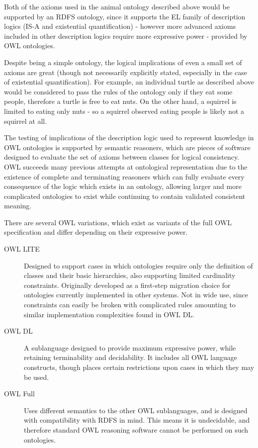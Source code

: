 \documentclass{article}
\begin{document}
Both of the axioms used in the animal ontology described above would be
supported by an RDFS ontology, since it supports the EL family of description
logics (IS-A and existential quantification) - however more advanced axioms
included in other description logics require more expressive power - provided by
OWL ontologies.

Despite being a simple ontology, the logical implications of even a small set of
axioms are great (though not necessarily explicitly stated, especially in the
case of existential quantification). For example, an individual turtle as described 
above would be considered to pass the rules of the ontology only if they eat some 
people, therefore a turtle is free to eat nuts. On the other hand, a squirrel is limited
to eating only nuts - so a squirrel observed eating people is likely not a squirrel at all.

The testing of implications of the description logic used to represent
knowledge in OWL ontologies is supported by semantic reasoners, which are 
pieces of software designed to evaluate the set of axioms between classes for 
logical consistency. OWL succeeds many previous attempts at ontological 
representation due to the existence of complete and terminating reasoners 
which can fully evaluate every consequence of the logic which exists in an 
ontology, allowing larger and more complicated ontologies to exist while 
continuing to contain validated consistent meaning.

There are several OWL variations, which exist as variants of the full OWL
specification and differ depending on their expressive power.

\begin{description}
    \item[OWL LITE] Designed to support cases in which ontologies require only
    the definition of classes and their basic hierarchies, also supporting
    limited cardinality constraints. Originally developed as a first-step
    migration choice for ontologies currently implemented in other systems. Not
    in wide use, since constraints can easily be broken with complicated rules
    amounting to similar implementation complexities found in OWL DL.
    \item[OWL DL] A sublanguage designed to provide maximum expressive power,
    while retaining terminability and decidability. It includes all OWL language
    constructs, though places certain restrictions upon cases in which they may
    be used. 
    \item[OWL Full] Uses different semantics to the other OWL sublanguages, and
    is designed with compatibility with RDFS in mind. This means it is
    undecidable, and therefore standard OWL reasoning software cannot be
    performed on such ontologies.
\end{description}
\end{document}

